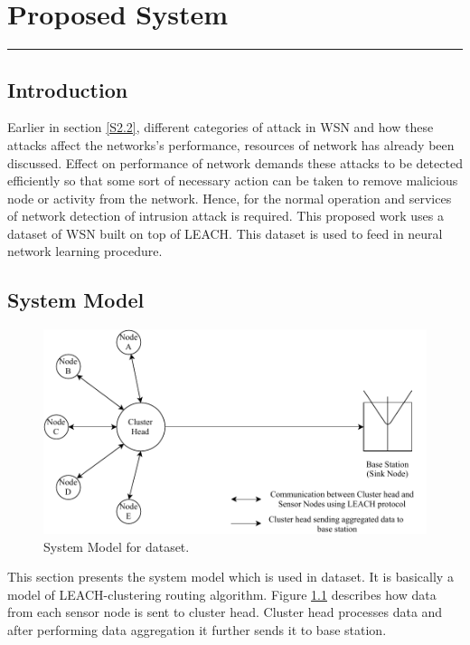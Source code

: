 \chapter{Proposed System}
\label{C5} %
\graphicspath{{Figures/PDF}}
\noindent\rule{\linewidth}{2pt}
\section{Introduction} \label{S5.1}
Earlier in section \ref{S2.2}, different categories of attack in WSN and how these attacks affect the networks's performance, resources of network has already been discussed. Effect on performance of network demands these attacks to be detected efficiently so that some sort of necessary action can be taken to remove malicious node or activity from the network. Hence, for the normal operation and services of network detection of intrusion attack is required. This proposed work uses a dataset of WSN built on top of LEACH. This dataset is used to feed in neural network learning procedure.
\section{System Model} \label{S5.2}
    \begin{figure}[h]
    \center	
    \includegraphics[scale=0.9]{Figures/PDF/SystemModel.pdf}
    \caption{System Model for dataset.}
    \label{SystemModel}	
    \end{figure}
This section presents the system model which is used in dataset. It is basically a model of LEACH-clustering routing algorithm. Figure \ref{SystemModel} describes how data from each sensor node is sent to cluster head. Cluster head processes data and after performing data aggregation it further sends it to base station.

